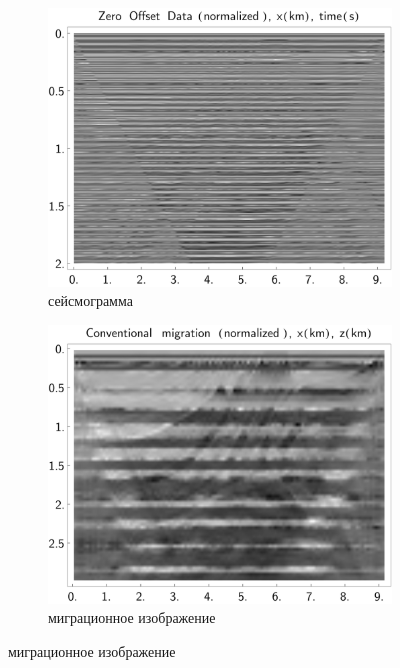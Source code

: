 \documentclass{article}
\begin{document}
\begin{figure}[tb]
\centering
\begin{subfigure}{.3333\textwidth}\includegraphics[width=\textwidth]{pic/report_april/zo_seism_toobad_norm}\caption{сейсмограмма}\end{subfigure}%
\begin{subfigure}{.3333\textwidth}\includegraphics[width=\textwidth]{pic/report_april/zo_migr_toobad_norm}\caption{миграционное изображение}\end{subfigure}%

\end{figure}
\end{document}

